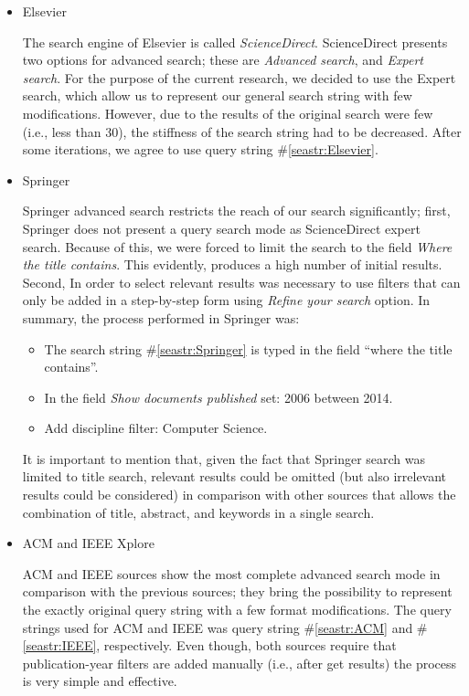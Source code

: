\begin{itemize}
	\item Elsevier
	
	The search engine of Elsevier is called \textit{ScienceDirect}. ScienceDirect presents two options for advanced search; these are \textit{Advanced search}, and \textit{Expert search}. For the purpose of the current research, we decided to use the Expert search, which allow us to represent our general search string with few modifications. However, due to the results of the original search were few (i.e., less than 30), the stiffness of the search string had to be decreased. After some iterations, we agree to use query string \#\ref{seastr:Elsevier}.
	
	\item Springer
	
	Springer advanced search restricts the reach of our search significantly; first, Springer does not present a query search mode as ScienceDirect expert search. Because of this, we were forced to limit the search to the field \textit{Where the title contains}. This evidently, produces a high number of initial results. Second, In order to select relevant results was necessary to use filters that can only be added in a step-by-step form using \textit{Refine your search} option. In summary, the process performed in Springer was:
	\begin{itemize}
		\item The search string \#\ref{seastr:Springer} is typed in the field “where the title contains”.
		\item In the field \textit{Show documents published} set: 2006 between 2014.
		\item Add discipline filter: Computer Science.
	\end{itemize}
	
	It is important to mention that, given the fact that Springer search was limited to title search, relevant results could be omitted (but also irrelevant results could be considered) in comparison with other sources that allows the combination of title, abstract, and keywords in a single search.
	
	\item ACM and IEEE Xplore
	
	ACM and IEEE sources show the most complete advanced search mode in comparison with the previous sources; they bring the possibility to represent the exactly original query string with a few format modifications. The query strings used for ACM and IEEE was query string \#\ref{seastr:ACM} and \#\ref{seastr:IEEE}, respectively. Even though, both sources require that publication-year filters are added manually (i.e., after get results) the process is very simple and effective.
	
\end{itemize}


